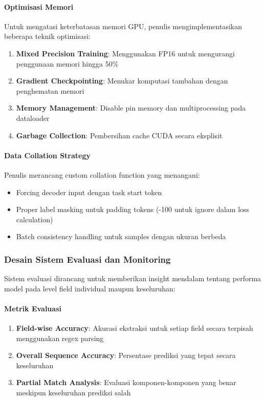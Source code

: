\paragraph{Optimisasi Memori}
Untuk mengatasi keterbatasan memori GPU, penulis mengimplementasikan beberapa teknik optimisasi:
\begin{enumerate}
    \item \textbf{Mixed Precision Training}: Menggunakan FP16 untuk mengurangi penggunaan memori hingga 50\%
    \item \textbf{Gradient Checkpointing}: Menukar komputasi tambahan dengan penghematan memori
    \item \textbf{Memory Management}: Disable pin memory dan multiprocessing pada dataloader
    \item \textbf{Garbage Collection}: Pembersihan cache CUDA secara eksplisit
\end{enumerate}

\paragraph{Data Collation Strategy}
Penulis merancang custom collation function yang menangani:
\begin{itemize}
    \item Forcing decoder input dengan task start token
    \item Proper label masking untuk padding tokens (-100 untuk ignore dalam loss calculation)
    \item Batch consistency handling untuk samples dengan ukuran berbeda
\end{itemize}

\subsubsection{Desain Sistem Evaluasi dan Monitoring}
\label{subsubsec:desain-evaluasi-monitoring}

Sistem evaluasi dirancang untuk memberikan insight mendalam tentang performa model pada level field individual maupun keseluruhan:

\paragraph{Metrik Evaluasi}
\begin{enumerate}
    \item \textbf{Field-wise Accuracy}: Akurasi ekstraksi untuk setiap field secara terpisah menggunakan regex parsing
    \item \textbf{Overall Sequence Accuracy}: Persentase prediksi yang tepat secara keseluruhan
    \item \textbf{Partial Match Analysis}: Evaluasi komponen-komponen yang benar meskipun keseluruhan prediksi salah
\end{enumerate}

